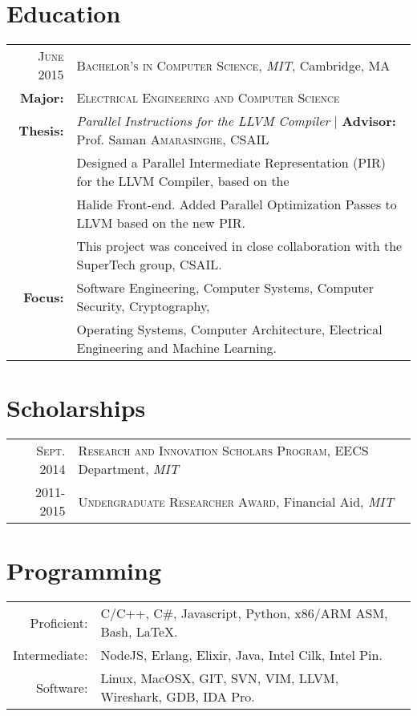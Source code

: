 \documentclass[lettersize,10pt]{article}
\begin{document}
\section{Education}
\begin{tabular}{rl}
\textsc{June} 2015 & \textsc{Bachelor's in Computer Science}, \emph{MIT}, Cambridge, MA\\
\textbf{Major:} & \textsc{Electrical Engineering and Computer Science}\\
\textbf{Thesis:} & \emph{Parallel Instructions for the LLVM Compiler} | \textbf{Advisor:} Prof. Saman \textsc{Amarasinghe}, CSAIL\\
& Designed a Parallel Intermediate Representation (PIR) for the LLVM Compiler, based on the \\
& Halide Front-end. Added Parallel Optimization Passes to LLVM based on the new PIR. \\
& This project was conceived in close collaboration with the SuperTech group, CSAIL. \\
\textbf{Focus:} &  Software Engineering, Computer Systems, Computer Security, Cryptography, \\
& Operating Systems, Computer Architecture, Electrical Engineering and Machine Learning.\\
\end{tabular}

\section{Scholarships}
\begin{tabular}{rl}
 \textsc{Sept.} 2014 & \textsc{Research and Innovation Scholars Program}, EECS Department, \emph{MIT}\\
2011-2015 & \textsc{Undergraduate Researcher Award}, Financial Aid, \emph{MIT}\\
\end{tabular}

\section{Programming}
\begin{tabular}{rl}
Proficient:& C/C++, C\#, Javascript, Python, x86/ARM ASM, Bash, \LaTeX.\\
Intermediate:& NodeJS, Erlang, Elixir, Java, Intel Cilk, Intel Pin.\\
Software:& Linux, MacOSX, GIT, SVN, VIM, LLVM, Wireshark, GDB, IDA Pro.\\
\end{tabular}
\end{document}
